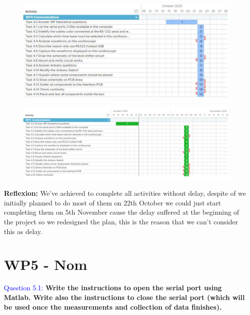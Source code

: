 \documentclass[12pt, a4papre]{article}
\begin{document}
	\begin{figure}[H]
		\begin{center}
		\includegraphics[width=135mm]{WP4_ini}
		\end{center}
	\end{figure}
	\begin{figure}[H]
		\begin{center}
		\includegraphics[width=135mm]{WP4_fin}
		\end{center}
	\end{figure}
	
	\textbf{Reflexion: }We’ve achieved to complete all activities without delay, despite of we initially planned to do most of them on 22th October we could just start completing them on 5th November cause the delay suffered at the beginning of the project so we redesigned the plan, this is the reason that we can’t consider this as delay.
	
	\newpage
	
	\section{WP5 - Nom}
	\textcolor{blue}{Question 5.1:} \textbf{Write the instructions to open the serial port using Matlab. Write also the instructions to close the serial port (which will be used once the measurements and collection of data finishes).}
	
	
		 
\end{document}
